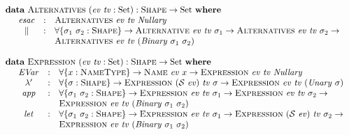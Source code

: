 \documentclass[a4paper]{jfp}
\begin{document}
\begin{figure}
\begin{displaymath}
\begin{array}{l}
\begin{array}{lll}
         \end{array} \\ \\
         \textbf{data}\ \textsc{Alternatives}\ (\mathit{ev}\ \mathit{tv} : \text{Set}) : \textsc{Shape} \rightarrow \text{Set}\ \textbf{where} \\
         \quad \begin{array}{cll}
            \mathit{esac} & : & \textsc{Alternatives}\ \mathit{ev}\ \mathit{tv}\ \mathit{Nullary} \\
            \Vert & : &  \forall \{\sigma_1\ \sigma_2 : \textsc{Shape}\} \rightarrow \textsc{Alternative}\ \mathit{ev}\ \mathit{tv}\ \sigma_1
      \rightarrow \textsc{Alternatives}\ \mathit{ev}\ \mathit{tv}\ \sigma_2 \rightarrow \\ & &  \textsc{Alternatives}\ \mathit{ev}\ \mathit{tv}\
   (\mathit{Binary}\ \sigma_1\ \sigma_2) 
         \end{array} \\ \\
         \textbf{data}\ \textsc{Expression}\ (\mathit{ev}\ \mathit{tv} : \text{Set}) : \textsc{Shape} \rightarrow \text{Set}\ \textbf{where} \\
      \quad \begin{array}{cll}
         \mathit{EVar} & : & \forall \{x : \textsc{NameType}\} \rightarrow \textsc{Name}\ \mathit{ev}\ x \rightarrow \textsc{Expression}\ \mathit{ev}\
   \mathit{tv}\ \mathit{Nullary} \\
         \lambda' & : & \forall \{ \sigma : \textsc{Shape} \} \rightarrow \textsc{Expression}\ (\mathcal{S}\ \mathit{ev})\ \mathit{tv}\ \sigma \rightarrow
   \textsc{Expression}\ \mathit{ev}\ \mathit{tv}\ (\mathit{Unary\ \sigma}) \\
         \mathit{app} & : & \forall \{ \sigma_1\ \sigma_2 : \textsc{Shape} \} \rightarrow \textsc{Expression}\ \mathit{ev}\ \mathit{tv}\ \sigma_1
   \rightarrow \textsc{Expression}\ \mathit{ev}\ \mathit{tv}\ \sigma_2 \rightarrow  \\ & & \textsc{Expression}\ \mathit{ev}\ \mathit{tv}\ (\mathit{Binary}
\ \sigma_1\ \sigma_2) \\
         \mathit{let} & : & \forall \{ \sigma_1\ \sigma_2 : \textsc{Shape} \} \rightarrow \textsc{Expression}\ \mathit{ev}\ \mathit{tv}\ \sigma_1
   \rightarrow \textsc{Expression}\ (\mathcal{S}\ \mathit{ev})\ \mathit{tv}\ \sigma_2 \rightarrow \\ &&\textsc{Expression}\ \mathit{ev}\ \mathit{tv}\
(\mathit{Binary}\ \sigma_1\ \sigma_2) \\

\end{array}
\end{array}
\end{displaymath}
\end{figure}
\end{document}
